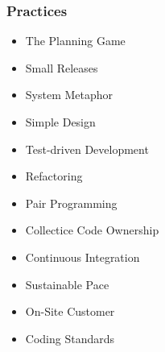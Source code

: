 \documentclass[../ESOF_notes.tex]{subfiles}
\begin{document}
\subsubsection{Practices}

\begin{itemize}
    \item The Planning Game
    \item Small Releases
    \item System Metaphor
    \item Simple Design
    \item Test-driven Development
    \item Refactoring
    \item Pair Programming
    \item Collectice Code Ownership
    \item Continuous Integration
    \item Sustainable Pace
    \item On-Site Customer
    \item Coding Standards
\end{itemize}
\end{document}
